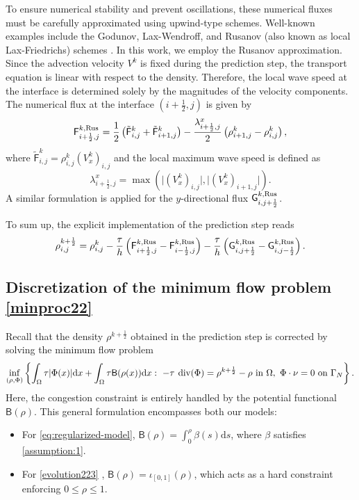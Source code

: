 \documentclass[final,reqno]{amsart}
\theoremstyle{plain}
\theoremstyle{definition}
\theoremstyle{remark}
\numberwithin{remark}{section}	%
\numberwithin{example}{section}	%
\DeclareMathOperator{\dive}{div}
\newcommand{\Om}{\Omega}
\newcommand{\dd}{\mathrm{d}}
\newcommand{\FF}{\mathsf{F}}
\newcommand{\GG}{\mathsf{G}}
\newcommand{\BB}{\mathsf{B}}
\newcommand{\I}{\iota}
\begin{document}
To ensure numerical stability and prevent oscillations, these numerical fluxes must be carefully approximated using upwind-type schemes. Well-known examples include the Godunov, Lax-Wendroff, and Rusanov (also known as local Lax-Friedrichs) schemes \cite{finitevolumeGallouet, Rusanovflux}. In this work, we employ the Rusanov approximation. Since the advection velocity $V^k$ is fixed during the prediction step, the transport equation is linear with respect to the density. Therefore, the local wave speed at the interface is determined solely by the magnitudes of the velocity components. The numerical flux at the interface $(i+\frac{1}{2}, j)$ is given by
\begin{equation}\label{eq:rusanov}
\FF_{i+\frac{1}{2},j}^{k,\textup{Rus}} = \frac{1}{2}\left(\tilde{\FF}^k_{i,j} + \tilde{\FF}^k_{i+1,j}\right) - \frac{\lambda_{i+\frac{1}{2},j}^x}{2}\left(\rho^k_{i+1,j}-\rho^k_{i,j}\right),
\end{equation}
where $\tilde{\FF}^k_{i,j} = \rho^k_{i,j} (V^k_x)_{i,j}$ and the local maximum wave speed is defined as 
\[
\lambda_{i+\frac{1}{2},j}^x = \max\left(\vert (V^k_x)_{i,j} \vert , \vert (V^k_x)_{i+1,j} \vert\right).
\]
A similar formulation is applied for the $y$-directional flux $\GG^{k,\textup{Rus}}_{i,j+\frac{1}{2}}$.

To sum up, the explicit implementation of the prediction step reads
\begin{equation}\label{t2}
	\rho_{i,j}^{k+\frac{1}{2}} = \rho_{i,j}^{k} - \frac{\tau}{h} \left(\FF_{i+\frac{1}{2},j}^{k,\textup{Rus}}-\FF_{i-\frac{1}{2},j}^{k,\textup{Rus}}\right) - \frac{\tau}{h} \left({\GG}^{k,\textup{Rus}}_{i,j+\frac{1}{2}}-{\GG}^{k,\textup{Rus}}_{i,j-\frac{1}{2}}\right).
\end{equation}
\subsection{Discretization of the minimum flow problem \eqref{minproc22}}

Recall that the density $\rho^{k+\frac{1}{2}}$ obtained in the prediction step is corrected by solving the minimum flow problem
\begin{equation}
    \label{beckmann1}
    \inf_{(\rho,\Phi)}\left\{  \int_\Om\tau\vert\Phi(x)\vert\dd x + \int_{\Om}\tau \BB(\rho(x))\dd x:~-\tau \:\dive(\Phi) = \rho^{k+\frac{1}{2}} - \rho\hbox{ in }  \Omega,\ \Phi\cdot \nu=0\hbox{ on }\Gamma_N \right\}.
\end{equation}
Here, the congestion constraint is entirely handled by the potential functional $\BB(\rho)$. This general formulation encompasses both our models:
\begin{itemize}
    \item For \eqref{eq:regularized-model}, $\BB(\rho) = \int_0^\rho \beta(s)\dd s$, where $\beta$ satisfies \cref{assumption:1}.
    \item For \eqref{evolution223} , $\BB(\rho) = \I_{[0,1]}(\rho)$, which acts as a hard constraint enforcing $0 \leq \rho \leq 1$.
\end{itemize}
\end{document}
